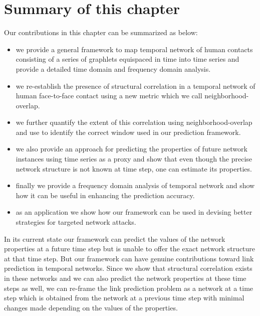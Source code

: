 \noindent
\section{Summary of this chapter}
\label{conclusion}

Our contributions in this chapter can be summarized as below:
\begin{itemize}

\item we provide a general framework to map temporal network of human contacts consisting of a series of graphlets equispaced in time into time series
and provide a detailed time domain and frequency domain analysis.

\item we re-establish the presence of structural correlation in a temporal network of human face-to-face contact using a new metric which we call
neighborhood-overlap.

\item we further quantify the extent of this correlation using neighborhood-overlap and use to identify the correct window used in our prediction framework.

\item we also provide an approach for predicting the properties of future network instances using time series as a proxy and show that even though the 
precise network structure is not known at time step, one can estimate its properties.

\item finally we provide a frequency domain analysis of temporal network and show how it can be useful in enhancing the prediction accuracy.

\item as an application we show how our framework can be used in devising better strategies for targeted network attacks.
 
 \end{itemize}
 
 In its current state our framework can predict the values of the network properties at a future time step but is unable to offer the exact network 
 structure at that time step. But our framework can have genuine contributions toward link prediction in temporal networks. Since we show that structural 
 correlation exists in these networks and we can also predict the network properties at these time steps as well, we can re-frame the link prediction problem 
 as a network at a time step which is obtained from the network at a previous time step with minimal changes made depending on the values of the properties. 


\medskip